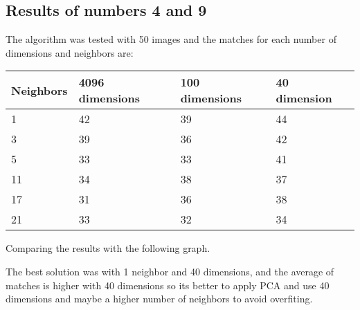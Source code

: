 \documentclass{article}
\begin{document}
\subsection{Results of numbers 4 and 9}
The algorithm was tested with 50 images and the matches for each number of dimensions and neighbors are:

\begin{table}[h]
\begin{tabular}{|l|l|l|l|}
\hline
Neighbors & 4096 dimensions & 100 dimensions & 40 dimension \\ \hline
1         & 42 & 39 & 44 \\ \hline
3         & 39 & 36 & 42 \\ \hline
5         & 33 & 33 & 41 \\ \hline
11        & 34 & 38 & 37 \\ \hline
17        & 31 & 36 & 38 \\ \hline
21        & 33 & 32 & 34 \\ \hline
\end{tabular}
\end{table}

Comparing the results with the following graph.

\begin{center}
\end{center}

The best solution was with 1 neighbor and 40 dimensions, and the average of matches is higher with 40 dimensions so its better to apply PCA and use 40 dimensions and maybe a higher number of neighbors to avoid overfiting.
\end{document}
